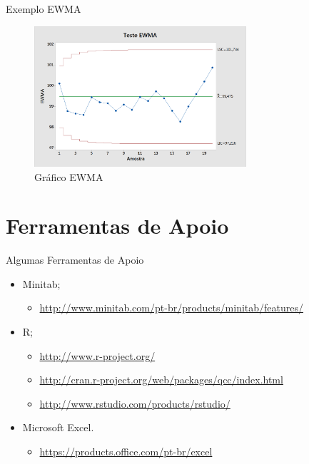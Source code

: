 \documentclass[12pt]{beamer}
\begin{document}
  \begin{frame}[t]{Exemplo EWMA}
    \begin{figure}[ht]
      \includegraphics[width=0.7\textwidth]{img/teste_ewma}
      \caption{Gráfico EWMA}
    \end{figure}
  \end{frame}

%

  \section{Ferramentas de Apoio}

  \begin{frame}[t]{Algumas Ferramentas de Apoio}
    \begin{itemize}
      \item Minitab;
        \begin{itemize}
          \item {\url{http://www.minitab.com/pt-br/products/minitab/features/}}
        \end{itemize}

      \item R;
        \begin{itemize}
          \item {\url{http://www.r-project.org/}}

          \item {\url{http://cran.r-project.org/web/packages/qcc/index.html}}

          \item {\url{http://www.rstudio.com/products/rstudio/}}
        \end{itemize}

      \item Microsoft Excel.
        \begin{itemize}
          \item {\url{https://products.office.com/pt-br/excel}}
        \end{itemize}
    \end{itemize}
  \end{frame}
\end{document}
